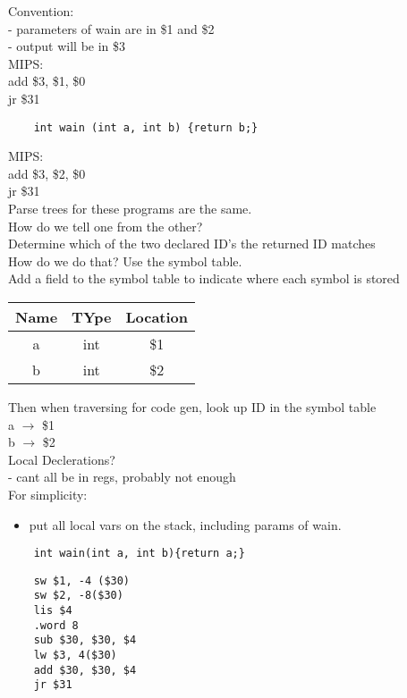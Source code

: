 \documentclass[12pt]{article}
\begin{document}
	Convention:\\
	- parameters of wain are in \$1 and \$2\\
	- output will be in \$3\\
	
	MIPS:\\
	add \$3, \$1, \$0\\
	jr \$31\\
	
	\begin{verbatim}
	int wain (int a, int b) {return b;}
	\end{verbatim}
	MIPS:\\
	add \$3, \$2, \$0\\
	jr \$31\\
	
	Parse trees for these programs are the same.\\
	How do we tell one from the other?\\
	Determine which of the two declared ID's the returned ID matches\\
	
	How do we do that? Use the symbol table.\\
	Add a field to the symbol table to indicate where each symbol is stored\\
	\begin{tabular}{c | c | c}
		Name & TYpe & Location \\ \hline
		a & int & \$1 \\
		b & int & \$2 \\
	\end{tabular}
	
	Then when traversing for code gen, look up ID in the symbol table\\
	a $\rightarrow$ \$1\\
	b $\rightarrow$ \$2\\
	
	Local Declerations?\\
	- cant all be in regs, probably not enough\\
	For simplicity:\\
	\begin{itemize}
		\item put all local vars on the stack, including params of wain.
	\end{itemize}
	\begin{verbatim}
	int wain(int a, int b){return a;}
	\end{verbatim}
	
	\begin{verbatim}
	sw $1, -4 ($30)
	sw $2, -8($30)
	lis $4
	.word 8
	sub $30, $30, $4
	lw $3, 4($30)
	add $30, $30, $4
	jr $31
	\end{verbatim}
	
	
	
	
\end{document}
